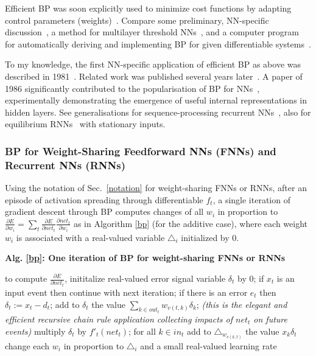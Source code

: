 \documentclass[letterpaper]{article}
\begin{document}
\begin{CJK*}{UTF8}{gbsn}
\begin{sloppypar}
Efficient BP was soon explicitly used to minimize cost functions by
adapting control parameters (weights)~\citep{dreyfus:1973}.
Compare some preliminary, NN-specific discussion~\citep[section 5.5.1]{Werbos:74}, 
a method for multilayer threshold NNs~\citep{bobrowski78},
and a computer program for automatically deriving and implementing BP 
for given differentiable systems~\citep{SPEELPENNING80A}.


To my knowledge, the first NN-specific application of
efficient BP as above was described in 1981~\citep{Werbos:81sensitivity,werbos2006backwards}.
Related work was published several  years later~\citep{Parker:85,LeCun:85,lecun-88}.
A paper of 1986 significantly contributed to the popularisation of BP for NNs~\citep{Rumelhart:86}, experimentally demonstrating the emergence of useful 
internal representations in hidden layers. 
See generalisations for sequence-processing 
recurrent NNs~\citep[e.g.,][]{Williams:89,RobinsonFallside:87tr,Werbos:88gasmarket,WilliamsZipser:88,WilliamsZipser:89nc,WilliamsZipser:89cs,Rohwer:89,Pearlmutter:89,Gherrity:89,WilliamsPeng:90,Schmidhuber:92ncn3,Pearlmutter:95,baldi95,kremer2001,atiya2000}, also for equilibrium RNNs~\citep{Almeida:87,Pineda:87} with stationary inputs.

\subsubsection{BP for Weight-Sharing Feedforward NNs (FNNs) and Recurrent NNs (RNNs)}
\label{bpsec}

Using the notation of Sec.~\ref{notation} for weight-sharing FNNs or RNNs, 
after an episode of activation spreading through differentiable $f_t$, 
a single iteration of gradient descent through BP computes
changes of all $w_i$ in proportion to 
$
\frac{\partial E}{\partial w_i}=
\sum_t
\frac{\partial E}{\partial net_t}
\frac{\partial net_t}{\partial w_i}
$ 
as in Algorithm \ref{bp} (for the additive case),
where each weight $w_i$ is associated with a real-valued variable $\triangle_i$ initialized by 0.

\begin{algorithm}{\bf Alg. \ref{bp}: One iteration  of BP for weight-sharing FNNs or RNNs} 
\label{bp}
\begin{algorithmic}
\STATE to compute $\frac{\partial E}{\partial net_t}$, inititalize real-valued error signal variable $\delta_t$ by 0;
\STATE if $x_t$ is an input event then continue with next iteration;
\STATE if there is an error $e_t$ then $\delta_t := x_t-d_t$;
\STATE add to $\delta_t$ the value $\sum_{k \in out_t}  w_{v(t,k)} \delta_k$;
{\em (this is the elegant and efficient recursive chain rule
application collecting impacts of $net_t$ on future events)} 
\STATE multiply  $\delta_t$ by $f'_t(net_t)$;
\STATE for all $k \in in_t$ add to  $\triangle_{w_{v(k,t)}}$ the value $x_k \delta_t$
\ENDFOR
\STATE change each $w_i$ in proportion to $\triangle_i$ and a small real-valued learning rate
\end{algorithmic}
\end{algorithm}


\end{sloppypar}
\end{CJK*}
\end{document}
